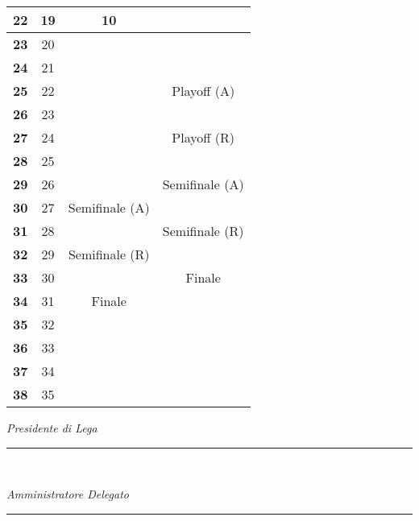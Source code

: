 \documentclass[12pt]{article}
\begin{document}
\begin{tabular}{|c|c|c|c|}
    \hline
    \textbf{22} & 19 & 10 &  \\
    \hline
    \textbf{23} & 20 &  &  \\
    \hline
    \textbf{24} & 21 &  &  \\
    \hline
    \textbf{25} & 22 &  & Playoff (A) \\
    \hline
    \textbf{26} & 23 &  &  \\
    \hline
    \textbf{27} & 24 &  & Playoff (R) \\
    \hline
    \textbf{28} & 25 &  &  \\
    \hline
    \textbf{29} & 26 &  & Semifinale (A) \\
    \hline
    \textbf{30} & 27 & Semifinale (A) &  \\
    \hline
    \textbf{31} & 28 &  & Semifinale (R) \\
    \hline
    \textbf{32} & 29 & Semifinale (R) &  \\
    \hline
    \textbf{33} & 30 &  & Finale \\
    \hline
    \textbf{34} & 31 & Finale &  \\
    \hline
    \textbf{35} & 32 &  &  \\
    \hline
    \textbf{36} & 33 &  &  \\
    \hline
    \textbf{37} & 34 &  &  \\
    \hline
    \textbf{38} & 35 &  &  \\
    \hline
\end{tabular}

\newpage
\thispagestyle{empty} %
\begin{flushright}

    \vspace*{\fill}
    \textit{Presidente di Lega}
    \vspace{0.5cm} %
    \rule{6cm}{0.4pt} \ %
    
    \textit{Amministratore Delegato}
    \vspace{0.5cm} %
    \rule{6cm}{0.4pt} \ %
    
\end{flushright}
\end{document}

